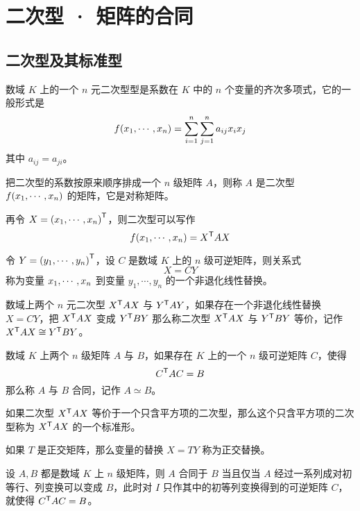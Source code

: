 \chapter{二次型 · 矩阵的合同}

\section{二次型及其标准型}

\begin{definition}
    数域 $K$ 上的一个 $n$ 元二次型型是系数在 $K$ 中的 $n$ 个变量的齐次多项式，它的一般形式是
    \[f(x_1,\cdots,x_n) = \sum_{i=1}^n\sum_{j=1}^na_{ij}x_ix_j\]
    其中 $a_{ij} = a_{ji}$。
\end{definition}

把二次型的系数按原来顺序排成一个 $n$ 级矩阵 $A$，则称 $A$ 是二次型 $f(x_1,\cdots,x_n)$ 的矩阵，它是对称矩阵。

再令 $X = {(x_1,\cdots,x_n)}^\mathsf{T}$，则二次型可以写作
\[f(x_1,\cdots,x_n) = {X}^\mathsf{T}AX\]

令 $Y = {(y_1,\cdots,y_n)}^\mathsf{T}$，设 $C$ 是数域 $K$ 上的 $n$ 级可逆矩阵，则关系式
\[X = CY\]
称为变量 $x_1,\cdots,x_n$ 到变量 $y_1,\cdots,y_n$ 的一个非退化线性替换。

\begin{definition}
    数域上两个 $n$ 元二次型 ${X}^\mathsf{T}AX$ 与 ${Y}^\mathsf{T}AY$，如果存在一个非退化线性替换 $X = CY$，把 ${X}^\mathsf{T}AX$ 变成 ${Y}^\mathsf{T}BY$ 那么称二次型 ${X}^\mathsf{T}AX$ 与 ${Y}^\mathsf{T}BY$ 等价，记作 ${X}^\mathsf{T}AX \cong {Y}^\mathsf{T}BY$。
\end{definition}

\begin{definition}
    数域 $K$ 上两个 $n$ 级矩阵 $A$ 与 $B$，如果存在 $K$ 上的一个 $n$ 级可逆矩阵 $C$，使得
    \[{C}^\mathsf{T}AC = B\]
    那么称 $A$ 与 $B$ 合同，记作 $A\simeq B$。
\end{definition}

如果二次型 ${X}^\mathsf{T} A X$ 等价于一个只含平方项的二次型，那么这个只含平方项的二次型称为 ${X}^\mathsf{T}AX$ 的一个标准形。

如果 $T$ 是正交矩阵，那么变量的替换 $X = TY$ 称为正交替换。

\begin{theorem}
    设 $A,B$ 都是数域 $K$ 上 $n$ 级矩阵，则 $A$ 合同于 $B$ 当且仅当 $A$ 经过一系列成对初等行、列变换可以变成 $B$，此时对 $I$ 只作其中的初等列变换得到的可逆矩阵 $C$，就使得 ${C}^\mathsf{T}AC=B$。
\end{theorem}

